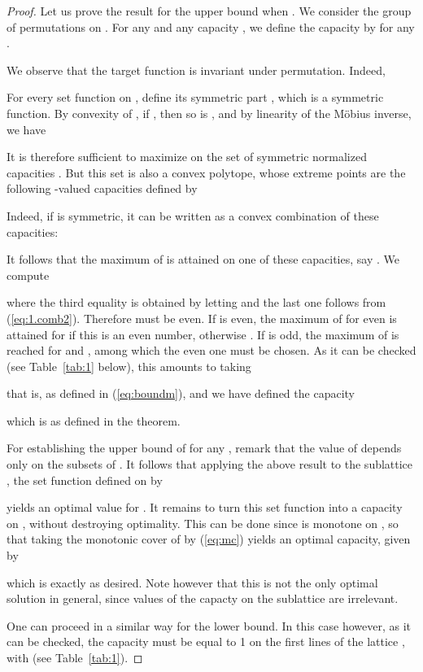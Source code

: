 \documentclass[12pt,a4paper]{article}
\theoremstyle{definition}
\theoremstyle{remark}
\begin{document}
\begin{proof}
Let us prove the result for the upper bound when .
 We consider the group  of permutations on . For any 
and any capacity , we define the capacity  by
 for any .

We observe that the target function  is invariant under
permutation. Indeed, 

For every set function  on , define its symmetric part , which is a symmetric function. By
convexity of , if , then so is , and by linearity
of the M\"obius inverse, we have

It is therefore sufficient to maximize  on the set of symmetric
normalized capacities . But this set is also a convex polytope, whose
extreme points are the following -valued capacities
 defined by

Indeed, if  is symmetric, it can be written as a convex combination of
these capacities:

It follows that the maximum of  is attained on one of these
capacities, say . We compute

where the third equality is obtained by letting  and the last one
follows from (\ref{eq:1.comb2}). 
Therefore  must be even.  If  is even, the maximum of 
for  even is attained for  if this is an even number,
otherwise . If  is odd, the maximum of  is
reached for  and ,
among which the even one must be chosen. As it can be checked (see
Table~\ref{tab:1} below), this amounts to taking

that is,  as defined in (\ref{eq:boundm}), and we have defined the capacity

which is  as defined in the theorem.


For establishing the upper bound of  for any ,
  remark that the value of  depends only on the subsets of . It
  follows that applying the above result to the sublattice , the set
  function  defined on  by

yields an optimal value for . It remains to turn this set function
into a capacity on , without destroying optimality. This can be done since 
is monotone on , so that taking the monotonic cover of  by
(\ref{eq:mc}) yields an optimal capacity, given by

which is exactly  as desired. Note however that this is not the only
optimal solution in general, since values of the capacty on the sublattice
 are irrelevant. 


One can proceed in a similar way for the lower bound. In this case however, as
it can be checked, the
capacity must be equal to 1 on the  first lines of the lattice ,
with  (see
Table~\ref{tab:1}).
\end{proof}
\end{document}

